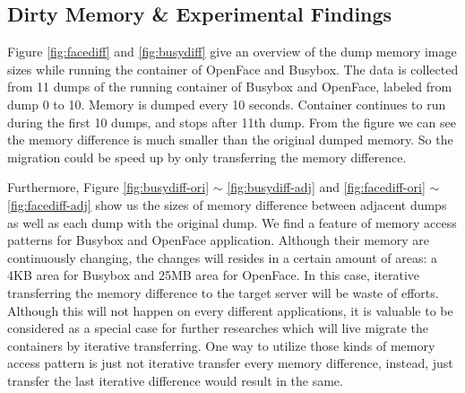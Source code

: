 



\subsection{Dirty Memory \& Experimental Findings}





Figure \ref{fig:facediff}
and  \ref{fig:busydiff} 
give an overview of the dump memory image sizes while running the container of OpenFace and Busybox. 
The data is collected from 11 dumps of the running container of Busybox and OpenFace, labeled from dump 0 to 10. Memory is dumped every 10 seconds. Container continues to run during the first 10 dumps, and stops after 11th dump. From the figure we can see the memory difference is much smaller than the original dumped memory. So the migration could be speed up by only  transferring the memory difference. 

Furthermore, 
Figure  
\ref{fig:busydiff-ori} $\sim$
\ref{fig:busydiff-adj}  
and 
\ref{fig:facediff-ori} $\sim$
\ref{fig:facediff-adj} 
show us the sizes of memory difference between adjacent dumps as well as each dump with the original dump. We find a feature of memory access patterns for Busybox and OpenFace application. Although their memory are continuously changing, the changes will resides in a certain amount of areas: a 4KB area for Busybox and 25MB area for OpenFace. 
In this case, iterative transferring the memory difference to the target server will be waste of efforts. Although this will not happen on every different applications, it is valuable to be considered as a special case for further researches which will live migrate the containers by iterative transferring. One way to utilize those kinds of memory access pattern is just not iterative transfer every memory difference, instead, just transfer the last iterative difference would result in the same.

